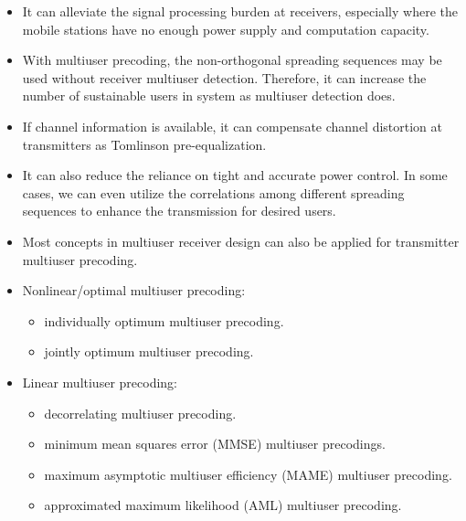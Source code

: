 \documentclass[20pt,landscape]{foils}
\begin{document}
\begin{itemize}

\item It can alleviate the signal processing burden at receivers,
especially where the mobile stations have no enough power supply
and computation capacity.

\item With multiuser precoding, the non-orthogonal spreading
sequences may be used without receiver multiuser detection.
Therefore, it can increase the number of sustainable users in
system as multiuser detection does.

\item If channel information is available, it can compensate
channel distortion at transmitters as Tomlinson pre-equalization.

\item It can also reduce the reliance on tight and accurate power
control. In some cases, we can even utilize the correlations among
different spreading sequences to enhance the transmission for
desired users.
\end{itemize}


\begin{itemize}
\item Most concepts in multiuser receiver design can also be
applied for transmitter multiuser precoding.

\item Nonlinear/optimal multiuser precoding:
    \begin{itemize}
    \item individually optimum multiuser precoding.
    \item jointly optimum multiuser precoding.
    \end{itemize}
\item Linear multiuser precoding:
    \begin{itemize}
    \item decorrelating multiuser precoding.
    \item minimum mean squares error (MMSE) multiuser precodings.
    \item maximum asymptotic multiuser efficiency (MAME) multiuser precoding.
    \item approximated maximum likelihood (AML) multiuser precoding.
    \end{itemize}
\end{itemize}
\end{document}
